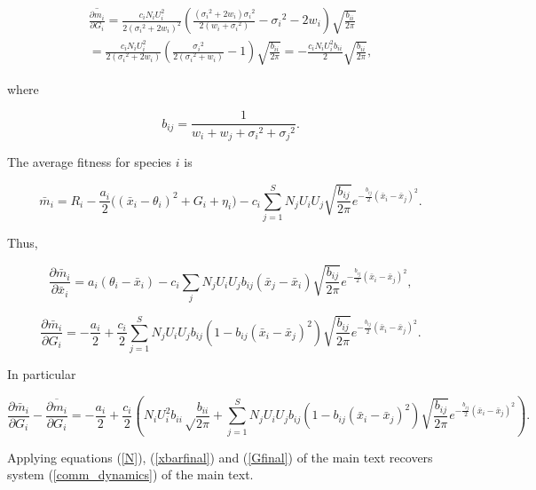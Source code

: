 \documentclass[]{article}
\begin{document}
\begin{multline}
\overline{\frac{\partial m_i}{\partial G_i}}=\frac{c_iN_iU_i^2}{2({\sigma_i}^2+2w_i)^2}\left(\frac{({\sigma_i}^2+2w_i){\sigma_i}^2}{2(w_i+{\sigma_i}^2)}-{\sigma_i}^2-2w_i\right)\sqrt{\frac{b_{ii}}{2\pi}} \\
=\frac{c_iN_iU_i^2}{2({\sigma_i}^2+2w_i)}\left(\frac{{\sigma_i}^2}{2({\sigma_i}^2+w_i)}-1\right)\sqrt{\frac{b_{ii}}{2\pi}}=-\frac{c_iN_iU_i^2b_{ii}}{2}\sqrt{\frac{b_{ii}}{2\pi}},
\end{multline}

where

\begin{equation}
b_{ij}=\frac{1}{w_i+w_j+{\sigma_i}^2+{\sigma_j}^2}.
\end{equation}

The average fitness for species \(i\) is

\begin{equation}
\bar m_i=R_i-\frac{a_i}{2}\Big((\bar x_i-\theta_i)^2+G_i+\eta_i\Big) - c_i\sum_{j=1}^SN_jU_iU_j\sqrt{\frac{b_{ij}}{2\pi}}e^{-\frac{b_{ij}}{2}(\bar x_i-\bar x_j)^2}.
\end{equation}

Thus,

\begin{equation}
\frac{\partial\bar m_i}{\partial\bar x_i}=a_i(\theta_i-\bar x_i)-c_i\sum_jN_jU_iU_jb_{ij}(\bar x_j-\bar x_i)\sqrt{\frac{b_{ij}}{2\pi}}e^{-\frac{b_{ij}}{2}(\bar x_i-\bar x_j)^2},
\end{equation}

\begin{equation}
\frac{\partial\bar m_i}{\partial G_i}=-\frac{a_i}{2}+\frac{c_i}{2}\sum_{j=1}^SN_jU_iU_jb_{ij}\left(1-b_{ij}(\bar x_i-\bar x_j)^2\right)\sqrt{\frac{b_{ij}}{2\pi}}e^{-\frac{b_{ij}}{2}(\bar x_i-\bar x_j)^2}.
\end{equation}

In particular

\begin{equation}
\frac{\partial\bar m_i}{\partial G_i}-\overline{\frac{\partial m_i}{\partial G_i}}=-\frac{a_i}{2}+\frac{c_i}{2}\left(N_iU_i^2b_{ii}\sqrt\frac{b_{ii}}{2\pi}+\sum_{j=1}^SN_jU_iU_jb_{ij}\left(1-b_{ij}(\bar x_i-\bar x_j)^2\right)\sqrt{\frac{b_{ij}}{2\pi}}e^{-\frac{b_{ij}}{2}(\bar x_i-\bar x_j)^2}\right).
\end{equation}

Applying equations (\ref{N}), (\ref{xbarfinal}) and (\ref{Gfinal}) of
the main text recovers system (\ref{comm_dynamics}) of the main text.
\end{document}
